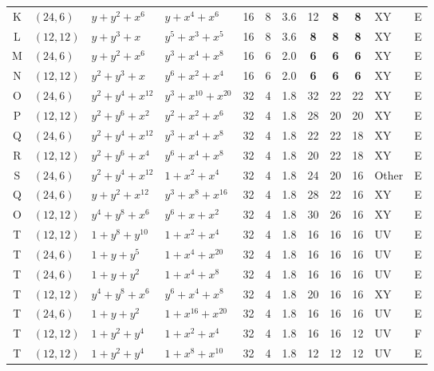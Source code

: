 \begin{table}[t]
\begin{tabular*}{\textwidth}{@{\extracolsep{\fill}}clllcccccclc}
K & $(24,6)$ & $y{+}y^{2}{+}x^{6}$ & $y{+}x^{4}{+}x^{6}$ & 16 & 8 & 3.6 & 12 & \textbf{8} & \textbf{8} & XY & E \\
L & $(12,12)$ & $y{+}y^{3}{+}x$ & $y^{5}{+}x^{3}{+}x^{5}$ & 16 & 8 & 3.6 & \textbf{8} & \textbf{8} & \textbf{8} & XY & E \\
M & $(24,6)$ & $y{+}y^{2}{+}x^{6}$ & $y^{3}{+}x^{4}{+}x^{8}$ & 16 & 6 & 2.0 & \textbf{6} & \textbf{6} & \textbf{6} & XY & E \\
N & $(12,12)$ & $y^{2}{+}y^{3}{+}x$ & $y^{6}{+}x^{2}{+}x^{4}$ & 16 & 6 & 2.0 & \textbf{6} & \textbf{6} & \textbf{6} & XY & E \\
O & $(24,6)$ & $y^{2}{+}y^{4}{+}x^{12}$ & $y^{3}{+}x^{10}{+}x^{20}$ & 32 & 4 & 1.8 & 32 & 22 & 22 & XY & E \\
P & $(12,12)$ & $y^{2}{+}y^{6}{+}x^{2}$ & $y^{2}{+}x^{2}{+}x^{6}$ & 32 & 4 & 1.8 & 28 & 20 & 20 & XY & E \\
Q & $(24,6)$ & $y^{2}{+}y^{4}{+}x^{12}$ & $y^{3}{+}x^{4}{+}x^{8}$ & 32 & 4 & 1.8 & 22 & 22 & 18 & XY & E \\
R & $(12,12)$ & $y^{2}{+}y^{6}{+}x^{4}$ & $y^{6}{+}x^{4}{+}x^{8}$ & 32 & 4 & 1.8 & 20 & 22 & 18 & XY & E \\
S & $(24,6)$ & $y^{2}{+}y^{4}{+}x^{12}$ & $1{+}x^{2}{+}x^{4}$ & 32 & 4 & 1.8 & 24 & 20 & 16 & Other & E \\
Q & $(24,6)$ & $y{+}y^{2}{+}x^{12}$ & $y^{3}{+}x^{8}{+}x^{16}$ & 32 & 4 & 1.8 & 28 & 22 & 16 & XY & E \\
O & $(12,12)$ & $y^{4}{+}y^{8}{+}x^{6}$ & $y^{6}{+}x{+}x^{2}$ & 32 & 4 & 1.8 & 30 & 26 & 16 & XY & E \\
T & $(12,12)$ & $1{+}y^{8}{+}y^{10}$ & $1{+}x^{2}{+}x^{4}$ & 32 & 4 & 1.8 & 16 & 16 & 16 & UV & E \\
T & $(24,6)$ & $1{+}y{+}y^{5}$ & $1{+}x^{4}{+}x^{20}$ & 32 & 4 & 1.8 & 16 & 16 & 16 & UV & E \\
T & $(24,6)$ & $1{+}y{+}y^{2}$ & $1{+}x^{4}{+}x^{8}$ & 32 & 4 & 1.8 & 16 & 16 & 16 & UV & E \\
T & $(12,12)$ & $y^{4}{+}y^{8}{+}x^{6}$ & $y^{6}{+}x^{4}{+}x^{8}$ & 32 & 4 & 1.8 & 20 & 16 & 16 & XY & E \\
T & $(24,6)$ & $1{+}y{+}y^{2}$ & $1{+}x^{16}{+}x^{20}$ & 32 & 4 & 1.8 & 16 & 16 & 16 & UV & E \\
T & $(12,12)$ & $1{+}y^{2}{+}y^{4}$ & $1{+}x^{2}{+}x^{4}$ & 32 & 4 & 1.8 & 16 & 16 & 12 & UV & F \\
T & $(12,12)$ & $1{+}y^{2}{+}y^{4}$ & $1{+}x^{8}{+}x^{10}$ & 32 & 4 & 1.8 & 12 & 12 & 12 & UV & E \\

\end{tabular*}
\end{table}
